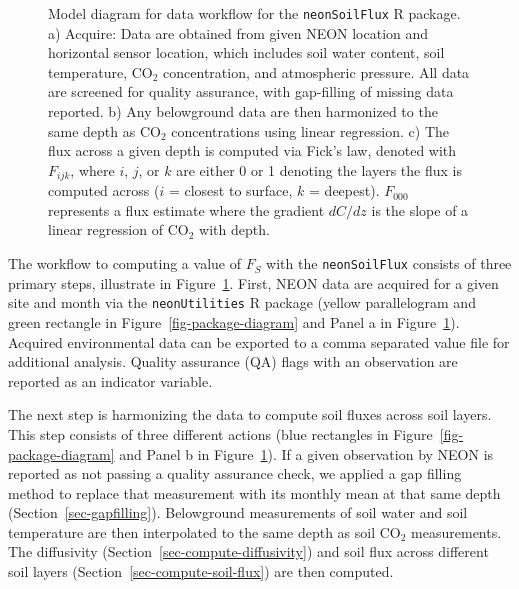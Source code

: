 \documentclass[
  letterpaper,
  DIV=11,
  numbers=noendperiod]{scrartcl}
\begin{document}
\begin{figure}


\caption{\label{fig-model-diagram}Model diagram for data workflow for
the \texttt{neonSoilFlux} R package. a) Acquire: Data are obtained from
given NEON location and horizontal sensor location, which includes soil
water content, soil temperature, CO\(_{2}\) concentration, and
atmospheric pressure. All data are screened for quality assurance, with
gap-filling of missing data reported. b) Any belowground data are then
harmonized to the same depth as CO\(_{2}\) concentrations using linear
regression. c) The flux across a given depth is computed via Fick's law,
denoted with \(F_{ijk}\), where \(i\), \(j\), or \(k\) are either 0 or 1
denoting the layers the flux is computed across (\(i\) = closest to
surface, \(k\) = deepest). \(F_{000}\) represents a flux estimate where
the gradient \(dC/dz\) is the slope of a linear regression of CO\(_{2}\)
with depth.}

\end{figure}%

The workflow to computing a value of \(F_{S}\) with the
\texttt{neonSoilFlux} consists of three primary steps, illustrate in
Figure~\ref{fig-model-diagram}. First, NEON data are acquired for a
given site and month via the \texttt{neonUtilities} R package (yellow
parallelogram and green rectangle in Figure~\ref{fig-package-diagram}
and Panel a in Figure~\ref{fig-model-diagram}). Acquired environmental
data can be exported to a comma separated value file for additional
analysis. Quality assurance (QA) flags with an observation are reported
as an indicator variable.

The next step is harmonizing the data to compute soil fluxes across soil
layers. This step consists of three different actions (blue rectangles
in Figure~\ref{fig-package-diagram} and Panel b in
Figure~\ref{fig-model-diagram}). If a given observation by NEON is
reported as not passing a quality assurance check, we applied a gap
filling method to replace that measurement with its monthly mean at that
same depth (Section~\ref{sec-gapfilling}). Belowground measurements of
soil water and soil temperature are then interpolated to the same depth
as soil CO\(_{2}\) measurements. The diffusivity
(Section~\ref{sec-compute-diffusivity}) and soil flux across different
soil layers (Section~\ref{sec-compute-soil-flux}) are then computed.
\end{document}

